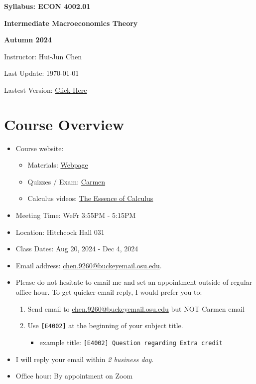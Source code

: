\documentclass[12pt]{article}
\begin{document}
\centerline{\huge\bf Syllabus: ECON 4002.01}
\medskip
\centerline{\LARGE \bf Intermediate Macroeconomics Theory}
\medskip
\centerline{\LARGE \bf Autumn 2024}
\medskip
\centerline{\Large Instructor: Hui-Jun Chen}
\centerline{Last Update: \today}
\centerline{Lastest Version: \href{https://huijunchen9260.github.io/pdf/IntermediateMacroAutumn2024/syllabus/build/syllabus.pdf}{Click Here}}

\medskip

\tableofcontents

\section*{Course Overview}
\begin{itemize}

    \item Course website:
    \begin{itemize}
        \item Materials: \href{https://huijunchen9260.github.io/IntermediateMacroAutumn2024.html}{Webpage}
        \item Quizzes / Exam: \href{https://osu.instructure.com/courses/143643}{Carmen}
        \item Calculus videos: \href{https://www.youtube.com/watch?v=WUvTyaaNkzM&list=PLZHQObOWTQDMsr9K-rj53DwVRMYO3t5Yr}{The Essence of Calculus}
    \end{itemize}
    \item Meeting Time: WeFr 3:55PM - 5:15PM
    \item Location: Hitchcock Hall 031
    \item Class Dates: Aug 20, 2024 - Dec 4, 2024
    \item Email address: \href{chen.9260@buckeyemail.osu.edu}{chen.9260@buckeyemail.osu.edu}.
    \item Please do not hesitate to email me and set an appointment outside of regular office hour. To get quicker email reply, I would prefer you to:
    \begin{enumerate}
        \item Send email to \href{chen.9260@buckeyemail.osu.edu}{chen.9260@buckeyemail.osu.edu} but NOT Carmen email
        \item Use \texttt{[E4002]} at the beginning of your subject title.
        \begin{itemize}
            \item example title: \texttt{[E4002] Question regarding Extra credit}
        \end{itemize}
    \end{enumerate}
    \item I will reply your email within \textit{2 business day}.
    \item Office hour: By appointment on Zoom
\end{itemize}
\end{document}
